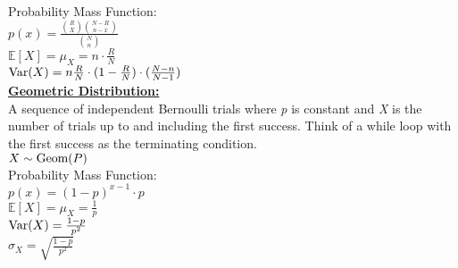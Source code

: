 \documentclass[letter, 12pt]{article}
\begin{document}
\begin{multicols}{2}
Probability Mass Function:\\
\(p(x) = \frac{{R \choose X}{{N-R} \choose {n-x}}}{{N \choose n}}\)\\
\(\mathds{E}[X] = \mu_X = n\cdot \frac{R}{N}\)\\
\(\textnormal{Var}(X) = n\frac{R}{N}\cdot(1-\frac{R}{N})\cdot(\frac{N-n}{N-1})\)\\
\textbf{\uline{Geometric Distribution:}}\\
A sequence of independent Bernoulli trials where \textit{p} is constant and \textit{X} is the number of trials up to and including the first success. Think of a while loop with the first success as the terminating condition.\\
\(X \sim \textnormal{Geom}(P)\)\\
Probability Mass Function:\\
\(p(x) = (1-p)^{x-1} \cdot p\)\\
\(\mathds{E}[X] = \mu_X = \frac{1}{p}\)\\
\(\textnormal{Var}(X) = \frac{1-p}{p^2}\)\\
\(\sigma_X = \sqrt{\frac{1-p}{p^2}}\)\\
\end{multicols}
\newpage
\end{document}
